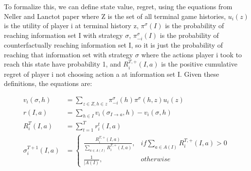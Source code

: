 \documentclass[11pt]{article}
\begin{document}
To formalize this, we can define state value, regret, using the equations from Neller and Lanctot paper where Z is the set of all terminal game histories, $u_i(z)$ is the utility of player i at terminal history z, $\pi^{\sigma}(I)$ is the probability of reaching information set I with strategy $\sigma$, $\pi_{-i}^{\sigma}(I)$ is the probability of counterfactually reaching information set I, so it is just the probability of reaching that information set with strategy $\sigma$ where the actions player i took to reach this state have probability 1, and $R_i^{T,+}(I,a)$ is the positive cumulative regret of player i not choosing action a at information set I. Given these definitions, the equations are:

\begin{align}
v_i(\sigma, h) &= \sum_{z \in Z, h \in z} \pi_{-i}^{\sigma}(h) \pi^{\sigma}(h,z)u_i(z)\\
r(I,a) &= \sum_{h \in I} v_i(\sigma_{I\rightarrow a}, h) - v_i(\sigma, h)\\
R_i^T(I,a) &= \sum_{t=1}^T r_i^t(I,a)\\
\sigma_i^{T+1}(I,a) &= \left\{
                \begin{array}{ll}
                  \frac{R_i^{T,+}(I,a)}{\sum_{a\in A(I)} R_i^{T,+}(I,a)},& if \sum_{a\in A(I)} R_i^{T,+}(I,a) > 0 \\
                  \frac{1}{|A(I)},& otherwise
                \end{array}
              \right.
\end{align}
\end{document}
